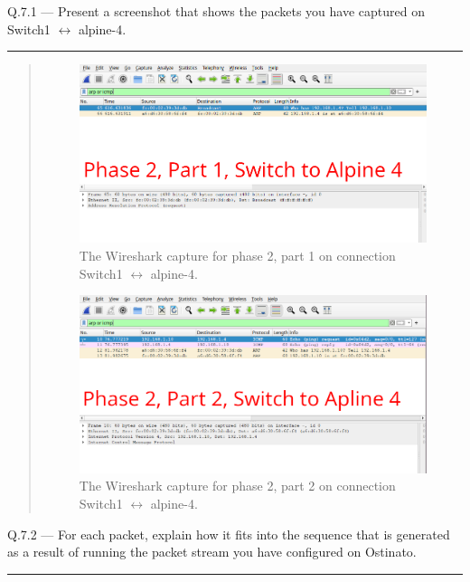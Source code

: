 \documentclass{article}
\newcommand\Que[2]{%
   \begin{samepage}
   \leavevmode\par
   \noindent
   Q.#1 --- #2\par\vspace{10pt}\hrule\vspace{10pt}
   \end{samepage}}
\newenvironment{ans}
   {\fbox{Answer}\begin{quote}\nopagebreak}
   {\end{quote}}
\begin{document}
\Que{7.1}{Present a screenshot that shows the packets you have
captured on Switch1 $\leftrightarrow$ alpine-4.}

\begin{ans}
\begin{figure}[H]
\centering
\includegraphics[width=14cm]{data/q6-phase2-switch-to-alpine4-part1.png}
\caption{The Wireshark capture for phase 2, part 1 on connection Switch1 $\leftrightarrow$ alpine-4.}
\label{fig:wireshark-phase2-part1-for-q6-conn2}
\end{figure}

\begin{figure}[H]
\centering
\includegraphics[width=14cm]{data/q6-phase2-switch-to-alpine4-part2.png}
\caption{The Wireshark capture for phase 2, part 2 on connection Switch1 $\leftrightarrow$ alpine-4.}
\label{fig:wireshark-phase2-part2-for-q6-conn2}
\end{figure}
\end{ans}

\Que{7.2}{For each packet, explain how it fits into the sequence
that is generated as a result of running the packet stream you
have configured on Ostinato.}
\end{document}

